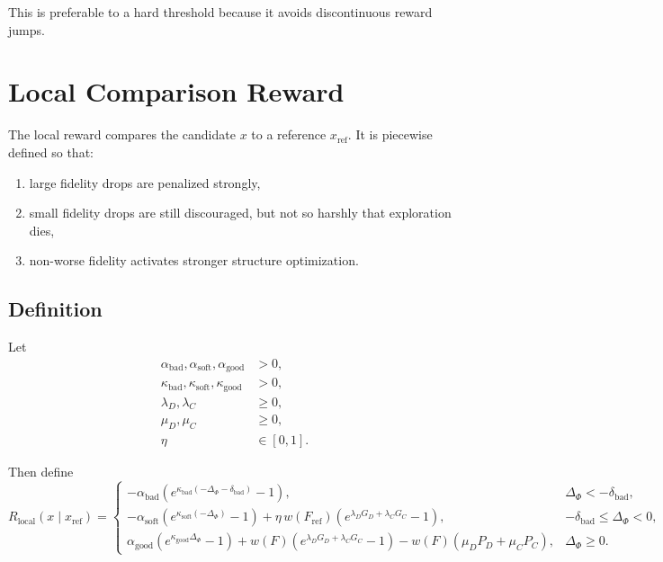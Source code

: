 \documentclass[11pt]{article}
\begin{document}
This is preferable to a hard threshold because it avoids discontinuous reward jumps.

\section{Local Comparison Reward}

The local reward compares the candidate $x$ to a reference $x_{\mathrm{ref}}$.
It is piecewise defined so that:
\begin{enumerate}[label=(\roman*)]
    \item large fidelity drops are penalized strongly,
    \item small fidelity drops are still discouraged, but not so harshly that exploration dies,
    \item non-worse fidelity activates stronger structure optimization.
\end{enumerate}

\subsection{Definition}

Let
\begin{align}
    \alpha_{\mathrm{bad}},\alpha_{\mathrm{soft}},\alpha_{\mathrm{good}} &> 0, \\
    \kappa_{\mathrm{bad}},\kappa_{\mathrm{soft}},\kappa_{\mathrm{good}} &> 0, \\
    \lambda_D,\lambda_C &\ge 0, \\
    \mu_D,\mu_C &\ge 0, \\
    \eta &\in [0,1].
\end{align}

Then define
\begin{equation}
R_{\mathrm{local}}(x\mid x_{\mathrm{ref}})=
\begin{cases}
-\alpha_{\mathrm{bad}}
\left(
    e^{\kappa_{\mathrm{bad}}(-\Delta_{\Phi}-\delta_{\mathrm{bad}})}-1
\right),
& \Delta_{\Phi}< -\delta_{\mathrm{bad}}, \\
-\alpha_{\mathrm{soft}}
\left(
    e^{\kappa_{\mathrm{soft}}(-\Delta_{\Phi})}-1
\right)
+
\eta\,w(F_{\mathrm{ref}})
\left(
    e^{\lambda_D G_D + \lambda_C G_C}-1
\right),
& -\delta_{\mathrm{bad}}\le \Delta_{\Phi}<0, \\
\alpha_{\mathrm{good}}
\left(
    e^{\kappa_{\mathrm{good}}\Delta_{\Phi}}-1
\right)
+
 w(F)
\left(
    e^{\lambda_D G_D + \lambda_C G_C}-1
\right)
-
 w(F)(\mu_D P_D + \mu_C P_C),
& \Delta_{\Phi}\ge 0.
\end{cases}
\label{eq:Rlocal}
\end{equation}
\end{document}
